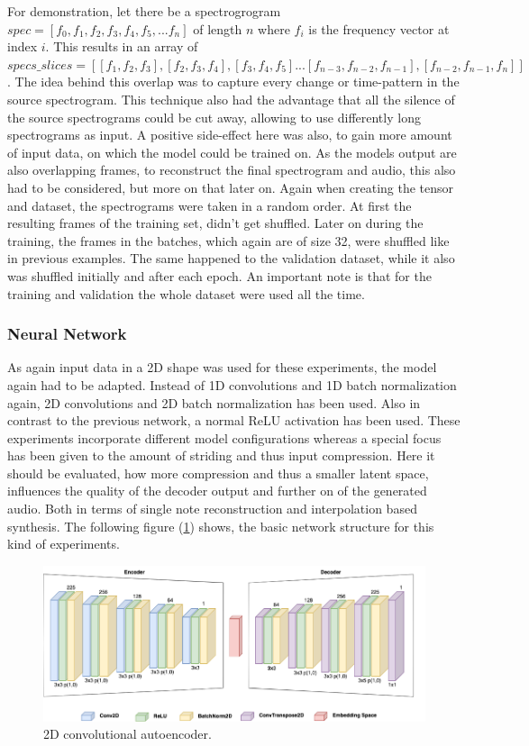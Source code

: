 For demonstration, let there be a spectrogrogram $spec=[f_0, f_1, f_2, f_3, f_4, f_5, ... f_n]$ of length $n$ where $f_i$ is the frequency vector at index $i$. This results in an array of $specs\_slices=[[f_1, f_2, f_3], [f_2, f_3, f_4], [f_3, f_4, f_5] ... [f_{n-3}, f_{n-2}, f_{n-1}], [f_{n-2}, f_{n-1}, f_n]]$. The idea behind this overlap was to capture every change or time-pattern in the source spectrogram. This technique also had the advantage that all the silence of the source spectrograms could be cut away, allowing to use differently long spectrograms as input. A positive side-effect here was also, to gain more amount of input data, on which the model could be trained on. As the models output are also overlapping frames, to reconstruct the final spectrogram and audio, this also had to be considered, but more on that later on. Again when creating the tensor and dataset, the spectrograms were taken in a random order. At first the resulting frames of the training set, didn't get shuffled. Later on during the training, the frames in the batches, which again are of size 32, were shuffled like in previous examples. The same happened to the validation dataset, while it also was shuffled initially and after each epoch. An important note is that for the training and validation the whole dataset were used all the time. 

\subsubsection{Neural Network}
As again input data in a 2D shape was used for these experiments, the model again had to be adapted. Instead of 1D convolutions and 1D batch normalization again, 2D convolutions and 2D batch normalization has been used. Also in contrast to the previous network, a normal ReLU activation has been used. These experiments incorporate different model configurations whereas a special focus has been given to the amount of striding and thus input compression. Here it should be evaluated, how more compression and thus a smaller latent space, influences the quality of the decoder output and further on of the generated audio. Both in terms of single note reconstruction and interpolation based synthesis. The following figure (\ref{fig:exp_2D_cae}) shows, the basic network structure for this kind of experiments.

 \begin{figure}[htb!]
	\caption{2D convolutional autoencoder.}
	\label{fig:exp_2D_cae}
	\centering
	\includegraphics[width=\textwidth]{images/experiments/autoencoder_2D.png}
\end{figure}

